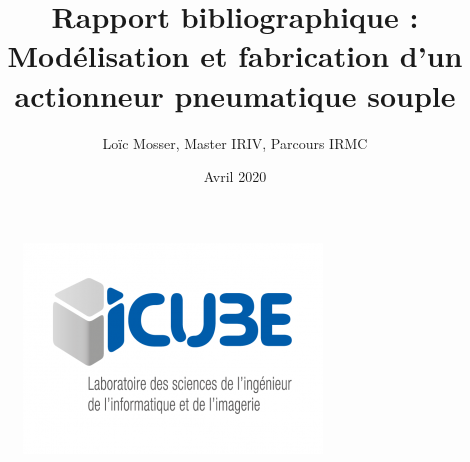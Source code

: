\documentclass[10pt, a4paper]{article}
\title{Rapport bibliographique : Modélisation et fabrication d’un actionneur pneumatique souple}
\author{Loïc Mosser, Master IRIV, Parcours IRMC}
\date{Avril 2020}
\begin{document}
\makeatletter

    \begin{titlepage}
    
        \begin{center}
             
            \begin{figure}[!htb]
            \begin{adjustwidth}{-3cm}{-3cm}  
               \begin{minipage}{0.30\textwidth}
                 \centering
                 \includegraphics[width=1\linewidth]{Logo/Icube.png}
                 

\end{minipage}
\end{adjustwidth}
\end{figure}
\end{center}
\end{titlepage}
\end{document}

